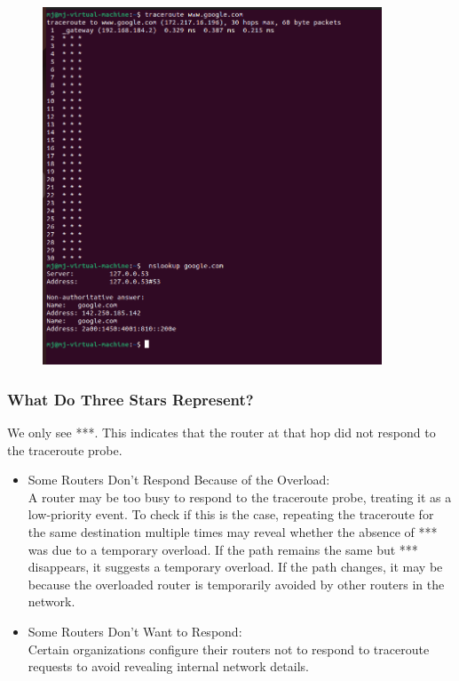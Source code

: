 \documentclass{report}
\begin{document}
\begin{figure}[h] 
  \centering 
  \includegraphics[width=0.9\textwidth]{12.png}
\end{figure} 



\subsubsection*{What Do Three Stars Represent?} 
We only see ***. This indicates that the router at that hop did not respond to the traceroute probe.

\begin{itemize}
  \item Some Routers Don’t Respond Because of the Overload:\\
  A router may be too busy to respond to the traceroute probe, treating it as a low-priority event. To check if this is the case, repeating the traceroute for the same destination multiple times may reveal whether the absence of *** was due to a temporary overload. If the path remains the same but *** disappears, it suggests a temporary overload. If the path changes, it may be because the overloaded router is temporarily avoided by other routers in the network.
  \item Some Routers Don’t Want to Respond:  \\
  Certain organizations configure their routers not to respond to traceroute requests to avoid revealing internal network details.\cite{6}

\end{itemize}
\end{document}
